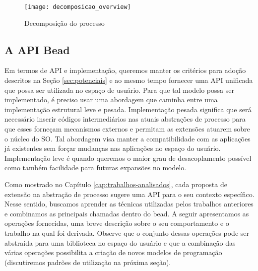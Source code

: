 \begin{figure}[!h]
  \centering
  \texttt{[image: decomposicao\_overview]}
  \caption{Decomposição do processo}
  \label{fig:decomposicao_proc}
\end{figure}

\subsection{A API Bead}
\label{sec:api}

Em termos de API e implementação, queremos manter os critérios para adoção
descritos na Seção \ref{sec:potenciais} e ao mesmo tempo fornecer uma API
unificada que possa ser utilizada no espaço de usuário. Para que tal modelo
possa ser implementado, é preciso usar uma abordagem que caminha entre uma
implementação estrutural leve e pesada. Implementação pesada significa que será
necessário inserir códigos intermediários nas atuais abstrações de processo para
que esses forneçam mecanismos externos e permitam as extensões atuarem sobre o
núcleo do SO. Tal abordagem visa manter a compatibilidade com as
aplicações já existentes sem forçar mudanças nas aplicações no espaço
do usuário. Implementação leve é quando queremos o maior grau de desacoplamento
possível como também facilidade para futuras expansões no modelo.

Como mostrado no Capítulo \ref{cap:trabalhos-analisados}, cada proposta de
extensão na abstração de processo sugere uma API para o seu contexto
específico. Nesse sentido, buscamos aprender as técnicas utilizadas pelos
trabalhos anteriores e combinamos as principais chamadas dentro do bead. A
seguir apresentamos as operações fornecidas, uma breve descrição sobre o seu
comportamento e o trabalho na qual foi derivada. Observe que o conjunto dessas
operações pode ser abstraída para uma biblioteca no espaço do usuário e que a
combinação das várias operações possibilita a criação de novos modelos de
programação (discutiremos padrões de utilização na próxima seção). 

